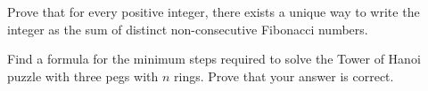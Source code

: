 
\question Prove that for every positive integer, there exists a unique way to write the integer as the sum of distinct non-consecutive Fibonacci numbers.


\question Find a formula for the minimum steps required to solve the Tower of Hanoi puzzle with three pegs with $n$ rings.
Prove that your answer is correct.

